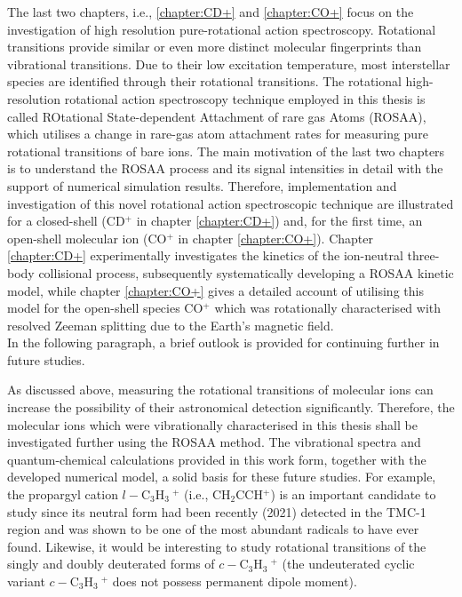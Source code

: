 The last two chapters, i.e., \ref{chapter:CD+} and \ref{chapter:CO+} focus on the investigation of high resolution pure-rotational action spectroscopy. Rotational transitions provide similar or even more distinct molecular fingerprints than vibrational transitions. Due to their low excitation temperature, most interstellar species are identified through their rotational transitions. The rotational high-resolution rotational action spectroscopy technique employed in this thesis is called ROtational State-dependent Attachment of rare gas Atoms (ROSAA), which utilises a change in rare-gas atom attachment rates for measuring pure rotational transitions of bare ions. The main motivation of the last two chapters is to understand the ROSAA process and its signal intensities in detail with the support of numerical simulation results. Therefore, implementation and investigation of this novel rotational action spectroscopic technique are illustrated for a closed-shell (CD$^+$ in chapter \ref{chapter:CD+}) and, for the first time, an open-shell molecular ion (CO$^+$ in chapter \ref{chapter:CO+}). Chapter \ref{chapter:CD+} experimentally investigates the kinetics of the ion-neutral three-body collisional process, subsequently systematically developing a ROSAA kinetic model, while chapter \ref{chapter:CO+} gives a detailed account of utilising this model for the open-shell species CO$^+$ which was rotationally characterised with resolved Zeeman splitting due to the Earth's magnetic field.\\


In the following paragraph, a brief outlook is provided for continuing further in future studies.

As discussed above, measuring the rotational transitions of molecular ions can increase the possibility of their astronomical detection significantly. Therefore, the molecular ions which were vibrationally characterised in this thesis shall be investigated further using the ROSAA method. The vibrational spectra and quantum-chemical calculations provided in this work form, together with the developed numerical model, a solid basis for these future studies. For example, the propargyl cation $l-$C$_3$H$_3\ ^+$ (i.e., CH$_2$CCH$^+$) is an important candidate to study since its neutral form had been recently (2021) detected in the TMC-1 region and was shown to be one of the most abundant radicals to have ever found. Likewise, it would be interesting to study rotational transitions of the singly and doubly deuterated forms of $c-$C$_3$H$_3\ ^+$ (the undeuterated cyclic variant $c-$C$_3$H$_3\ ^+$ does not possess permanent dipole moment).


